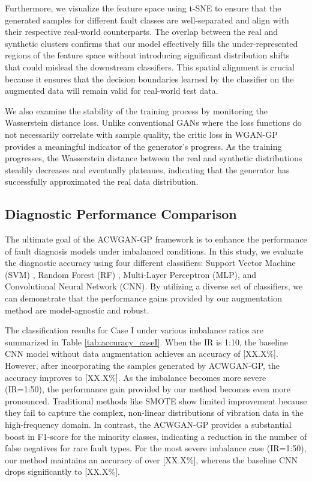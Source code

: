 Furthermore, we visualize the feature space using t-SNE \cite{Maaten2008} to ensure that the generated samples for different fault classes are well-separated and align with their respective real-world counterparts. The overlap between the real and synthetic clusters confirms that our model effectively fills the under-represented regions of the feature space without introducing significant distribution shifts that could mislead the downstream classifiers. This spatial alignment is crucial because it ensures that the decision boundaries learned by the classifier on the augmented data will remain valid for real-world test data.

We also examine the stability of the training process by monitoring the Wasserstein distance loss. Unlike conventional GANs where the loss functions do not necessarily correlate with sample quality, the critic loss in WGAN-GP provides a meaningful indicator of the generator's progress. As the training progresses, the Wasserstein distance between the real and synthetic distributions steadily decreases and eventually plateaues, indicating that the generator has successfully approximated the real data distribution.

\subsection{Diagnostic Performance Comparison}
The ultimate goal of the ACWGAN-GP framework is to enhance the performance of fault diagnosis models under imbalanced conditions. In this study, we evaluate the diagnostic accuracy using four different classifiers: Support Vector Machine (SVM) \cite{Cortes1995}, Random Forest (RF) \cite{Breiman2001}, Multi-Layer Perceptron (MLP), and Convolutional Neural Network (CNN). By utilizing a diverse set of classifiers, we can demonstrate that the performance gains provided by our augmentation method are model-agnostic and robust.

The classification results for Case I under various imbalance ratios are summarized in Table \ref{tab:accuracy_caseI}. When the IR is 1:10, the baseline CNN model without data augmentation achieves an accuracy of [XX.X\%]. However, after incorporating the samples generated by ACWGAN-GP, the accuracy improves to [XX.X\%]. As the imbalance becomes more severe (IR=1:50), the performance gain provided by our method becomes even more pronounced. Traditional methods like SMOTE \cite{6} show limited improvement because they fail to capture the complex, non-linear distributions of vibration data in the high-frequency domain. In contrast, the ACWGAN-GP provides a substantial boost in F1-score for the minority classes, indicating a reduction in the number of false negatives for rare fault types. For the most severe imbalance case (IR=1:50), our method maintains an accuracy of over [XX.X\%], whereas the baseline CNN drops significantly to [XX.X\%].

